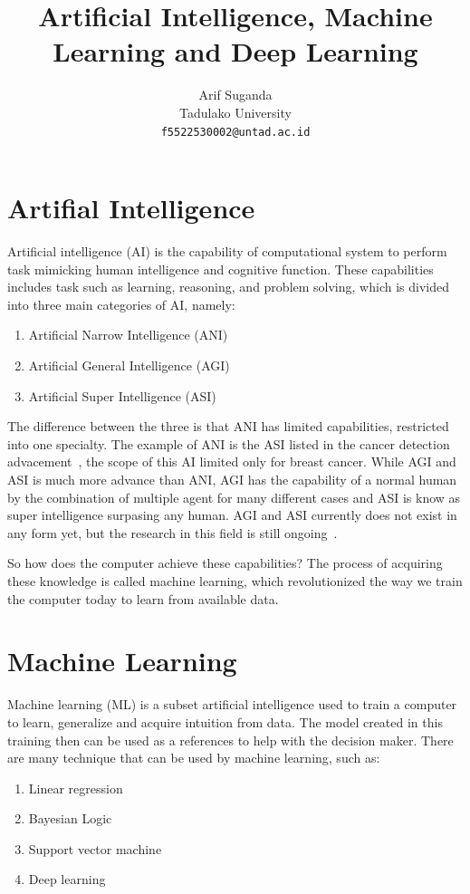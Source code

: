 \documentclass[a4paper,10pt]{article}
\title{Artificial Intelligence, Machine Learning and Deep Learning}
\author{Arif Suganda\\
        Tadulako University\\
        \texttt{f5522530002@untad.ac.id}
}
\begin{document}
\maketitle

\section{Artifial Intelligence}

Artificial intelligence (AI) is the capability of computational system to perform task mimicking human intelligence and cognitive function.
These capabilities includes task such as learning, reasoning, and problem solving, which is divided into three main categories of AI, namely:
\begin{enumerate}
    \item Artificial Narrow Intelligence (ANI)
    \item Artificial General Intelligence (AGI)
    \item Artificial Super Intelligence (ASI)
\end{enumerate}

The difference between the three is that ANI has limited capabilities, restricted into one specialty.
The example of ANI is the ASI listed in the cancer detection advacement~\cite{Darbandi2026Cancer}, the scope of this AI limited only for breast cancer.
While AGI and ASI is much more advance than ANI, AGI has the capability of a normal human by the combination of multiple agent for many different cases and ASI is know as super intelligence surpasing any human.
AGI and ASI currently does not exist in any form yet, but the research in this field is still ongoing~\cite{ibm_ai_comparison}.

So how does the computer achieve these capabilities? 
The process of acquiring these knowledge is called machine learning, which revolutionized the way we train the computer today to learn from available data.

\section{Machine Learning}

Machine learning (ML) is a subset artificial intelligence used to train a computer to learn, generalize and acquire intuition from data.
The model created in this training then can be used as a references to help with the decision maker.
There are many technique that can be used by machine learning, such as:
\begin{enumerate}
    \item Linear regression
    \item Bayesian Logic
    \item Support vector machine
    \item Deep learning
\end{enumerate}
\end{document}
